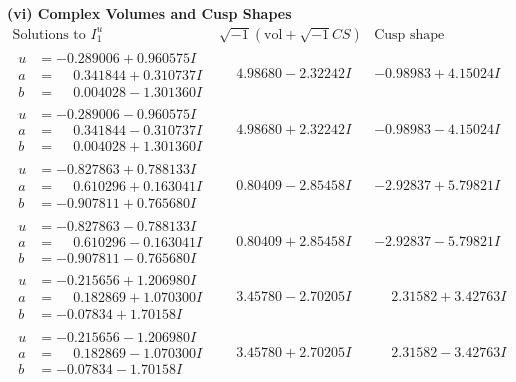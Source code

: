 \documentclass[1p]{elsarticle_modified}
\theoremstyle{definition}
\newcommand{\I}{\sqrt{-1}}
\begin{document}
\newpage\flushleft \textbf{(vi) Complex Volumes and Cusp Shapes}
$$\begin{array}{c|c|c}  
\text{Solutions to }I^u_{1}& \I (\text{vol} + \sqrt{-1}CS) & \text{Cusp shape}\\
 \hline 
\begin{aligned}
u &= -0.289006 + 0.960575 I \\
a &= \phantom{-}0.341844 + 0.310737 I \\
b &= \phantom{-}0.004028 - 1.301360 I\end{aligned}
 & \phantom{-}4.98680 - 2.32242 I & -0.98983 + 4.15024 I \\ \hline\begin{aligned}
u &= -0.289006 - 0.960575 I \\
a &= \phantom{-}0.341844 - 0.310737 I \\
b &= \phantom{-}0.004028 + 1.301360 I\end{aligned}
 & \phantom{-}4.98680 + 2.32242 I & -0.98983 - 4.15024 I \\ \hline\begin{aligned}
u &= -0.827863 + 0.788133 I \\
a &= \phantom{-}0.610296 + 0.163041 I \\
b &= -0.907811 + 0.765680 I\end{aligned}
 & \phantom{-}0.80409 - 2.85458 I & -2.92837 + 5.79821 I \\ \hline\begin{aligned}
u &= -0.827863 - 0.788133 I \\
a &= \phantom{-}0.610296 - 0.163041 I \\
b &= -0.907811 - 0.765680 I\end{aligned}
 & \phantom{-}0.80409 + 2.85458 I & -2.92837 - 5.79821 I \\ \hline\begin{aligned}
u &= -0.215656 + 1.206980 I \\
a &= \phantom{-}0.182869 + 1.070300 I \\
b &= -0.07834 + 1.70158 I\end{aligned}
 & \phantom{-}3.45780 - 2.70205 I & \phantom{-}2.31582 + 3.42763 I \\ \hline\begin{aligned}
u &= -0.215656 - 1.206980 I \\
a &= \phantom{-}0.182869 - 1.070300 I \\
b &= -0.07834 - 1.70158 I\end{aligned}
 & \phantom{-}3.45780 + 2.70205 I & \phantom{-}2.31582 - 3.42763 I \\ \hline\begin{aligned}

\end{aligned}
\end{array}$$
\end{document}
